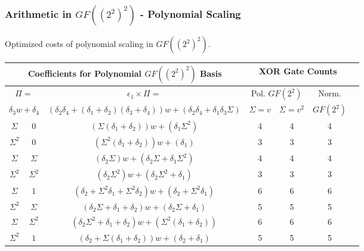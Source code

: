 \documentclass[handout,10pt]{beamer}
\begin{document}
\begin{frame}
	\frametitle{Arithmetic in $GF((2^2)^2)$ - Polynomial Scaling}
Optimized costs of polynomial scaling in $GF((2^2)^2)$.
\begin{table}[ht!]
\centering
\scriptsize
	\begin{tabular}{|c|c|c|c|c|c|c|} \hline
		\multicolumn{3}{|c|}{Coefficients for Polynomial $GF((2^2)^2)$ Basis} & \multicolumn{3}{c|}{XOR Gate Counts} \\ \hline
		\multicolumn{2}{|c}{$\Pi = $} & \multicolumn{1}{|c|}{$\epsilon_1 \times \Pi = $} & \multicolumn{2}{|c|}{Pol. $GF(2^2)$} & \multicolumn{1}{c|}{Norm.} \\
		\multicolumn{2}{|c|}{$\delta_3 w + \delta_4$} & \multicolumn{1}{c}{$(\delta_2\delta_4 + (\delta_1 + \delta_2)(\delta_3 + \delta_4))w + (\delta_2\delta_4 + \delta_1\delta_3\Sigma)$} & \multicolumn{1}{|c|}{$\Sigma = v$} & \multicolumn{1}{|c|}{$\Sigma = v^2$} & \multicolumn{1}{|c|}{$GF(2^2)$} \\ \hline

		$\Sigma$ & $0$          & $(\Sigma(\delta_1 + \delta_2))w + (\delta_1\Sigma^2)$                         & 4 & 4 & 4  \\
		$\Sigma^2$ & $0$        & $(\Sigma^2(\delta_1 + \delta_2))w + (\delta_1)$                               & 3 & 3 & 3  \\
		$\Sigma$ & $\Sigma$     & $(\delta_2\Sigma)w + (\delta_2\Sigma + \delta_1\Sigma^2)$                     & 4 & 4 & 4  \\
		$\Sigma^2$ & $\Sigma^2$ & $(\delta_2\Sigma^2)w + (\delta_2\Sigma^2 + \delta_1)$                         & 3 & 3 & 3  \\
		$\Sigma$ & $1$          & $(\delta_2 + \Sigma^2\delta_1 + \Sigma^2\delta_2)w + (\delta_2 + \Sigma^2\delta_1)$ & 6 & 6 & 6  \\
		$\Sigma^2$ & $\Sigma$   & $(\delta_2\Sigma + \delta_1 + \delta_2)w + (\delta_2\Sigma + \delta_1)$       & 5 & 5 & 5 \\
		$\Sigma$ & $\Sigma^2$   & $(\delta_2\Sigma^2 + \delta_1 + \delta_2)w + (\Sigma^2(\delta_1 + \delta_2))$ & 6 & 6 & 6  \\
		$\Sigma^2$ & $1$        & $(\delta_2 + \Sigma(\delta_1 + \delta_2))w + (\delta_2 + \delta_1)$     & 5 & 5 & 5 \\ \hline
    \end{tabular}
\end{table}
\end{frame}
\end{document}

